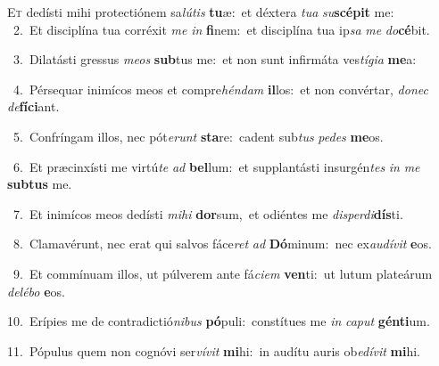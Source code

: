 \lettrine{\initial\textcolor{\initialcolor}{E}}{t} dedísti mihi protectiónem sa\-\textit{lú}\-\textit{tis} \textbf{tu}\-æ:~\star et déxtera \textit{tu}\-\textit{a} \textit{su}\-\textbf{scé}\textbf{pit} me:\\
{\numbfont\textcolor{\numbcolor}{~2.}}~Et disciplína tua corréxit \textit{me} \textit{in} \textbf{fi}\-nem:~\star et disciplína tua ip\textit{sa} \textit{me} \textit{do}\-\textbf{cé}bit.\par
{\numbfont\textcolor{\numbcolor}{~3.}}~Dilatásti gressus \textit{me}\-\textit{os} \textbf{sub}\-tus me:~\star et non sunt infirmáta ves\-\textit{tí}\-\textit{gi}\textit{a} \textbf{me}\-a:\par
{\numbfont\textcolor{\numbcolor}{~4.}}~Pérsequar inimícos meos et compre\-\textit{hén}\-\textit{dam} \textbf{il}\-los:~\star et non convértar, \textit{do}\-\textit{nec} \textit{de}\-\textbf{fí}\textbf{ci}ant.\par
{\numbfont\textcolor{\numbcolor}{~5.}}~Confríngam illos, nec pót\-\textit{e}\-\textit{runt} \textbf{sta}\-re:~\star cadent sub\textit{tus} \textit{pe}\-\textit{des} \textbf{me}\-os.\par
{\numbfont\textcolor{\numbcolor}{~6.}}~Et præcinxísti me virtú\textit{te} \textit{ad} \textbf{bel}\-lum:~\star et supplantásti insurgén\textit{tes} \textit{in} \textit{me} \textbf{sub}\-\textbf{tus} me.\par
{\numbfont\textcolor{\numbcolor}{~7.}}~Et inimícos meos dedísti \textit{mi}\-\textit{hi} \textbf{dor}\-sum,~\star et odiéntes me \textit{dis}\-\textit{per}\textit{di}\textbf{dís}ti.\par
{\numbfont\textcolor{\numbcolor}{~8.}}~Clamavérunt, nec erat qui salvos fáce\textit{ret} \textit{ad} \textbf{Dó}\-minum:~\star nec ex\-\textit{au}\-\textit{dí}\textit{vit} \textbf{e}\-os.\par
{\numbfont\textcolor{\numbcolor}{~9.}}~Et commínuam illos, ut púlverem ante fá\-\textit{ci}\-\textit{em} \textbf{ven}\-ti:~\star ut lutum plateárum \textit{de}\-\textit{lé}\textit{bo} \textbf{e}\-os.\par
{\numbfont\textcolor{\numbcolor}{10.}}~Erípies me de contradictió\-\textit{ni}\-\textit{bus} \textbf{pó}\-puli:~\star constítues me \textit{in} \textit{ca}\-\textit{put} \textbf{gén}\-\textbf{ti}um.\par
{\numbfont\textcolor{\numbcolor}{11.}}~Pópulus quem non cognóvi ser\-\textit{ví}\-\textit{vit} \textbf{mi}\-hi:~\star in audítu auris ob\-\textit{e}\-\textit{dí}\textit{vit} \textbf{mi}\-hi.\par
